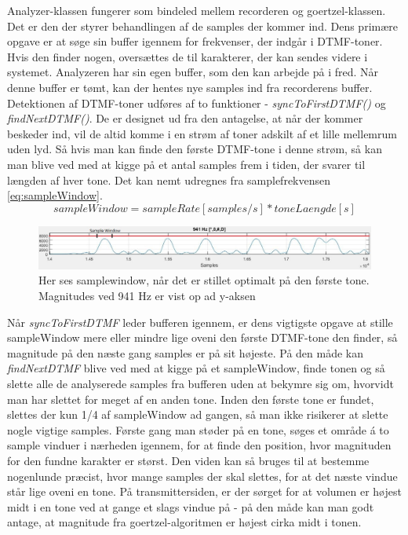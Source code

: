 Analyzer-klassen fungerer som bindeled mellem recorderen og goertzel-klassen. Det er den der styrer behandlingen af de samples der kommer ind. Dens primære opgave er at søge sin buffer igennem for frekvenser, der indgår i DTMF-toner. Hvis den finder nogen, oversættes de til karakterer, der kan sendes videre i systemet. Analyzeren har sin egen buffer, som den kan arbejde på i fred. Når denne buffer er tømt, kan der hentes nye samples ind fra recorderens buffer. \\

Detektionen af DTMF-toner udføres af to funktioner - \textit{syncToFirstDTMF()} og \textit{findNextDTMF()}. De er designet ud fra den antagelse, at når der kommer beskeder ind, vil de altid komme i en strøm af toner adskilt af et lille mellemrum uden lyd. Så hvis man kan finde den første DTMF-tone i denne strøm, så kan man blive ved med at kigge på et antal samples frem i tiden, der svarer til længden af hver tone. Det kan nemt udregnes fra samplefrekvensen \eqref{eq:sampleWindow}. \\

\begin{equation}
sampleWindow=sampleRate[samples/s]*toneLaengde[s]
\label{eq:sampleWindow}
\end{equation}

\begin{figure}[h!]
\centering
\includegraphics[scale=0.5]{Billeder/Samplewindow.PNG}
\caption{Her ses samplewindow, når det er stillet optimalt på den første tone. Magnitudes ved 941 Hz er vist op ad y-aksen}
\label{fig:Samplewindow}
\end{figure}

Når \textit{syncToFirstDTMF} leder bufferen igennem, er dens vigtigste opgave at stille sampleWindow mere eller mindre lige oveni den første DTMF-tone den finder, så magnitude på den næste gang samples er på sit højeste. På den måde kan \textit{findNextDTMF} blive ved med at kigge på et sampleWindow, finde tonen og så slette alle de analyserede samples fra bufferen uden at bekymre sig om, hvorvidt man har slettet for meget af en anden tone. Inden den første tone er fundet, slettes der kun 1/4 af sampleWindow ad gangen, så man ikke risikerer at slette nogle vigtige samples. Første gang man støder på en tone, søges et område á to sample vinduer i nærheden igennem, for at finde den position, hvor magnituden for den fundne karakter er størst. Den viden kan så bruges til at bestemme nogenlunde præcist, hvor mange samples der skal slettes, for at det næste vindue står lige oveni en tone. På transmittersiden, er der sørget for at volumen er højest midt i en tone ved at gange et slags vindue på - på den måde kan man godt antage, at magnitude fra goertzel-algoritmen er højest cirka midt i tonen.

